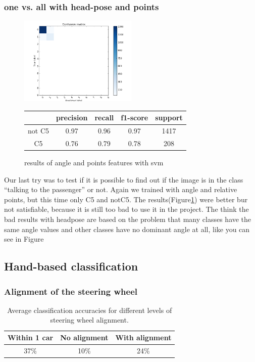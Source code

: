 \documentclass[10pt,twocolumn,letterpaper]{article}
\begin{document}
\subsubsection{one vs. all with head-pose and points}
\begin{figure}[h]
	\centering
	\includegraphics[width=0.5\textwidth]{c5ornot.png}\hspace{0.01\textwidth}
	\begin{tabular}{c||c|c|c|c}
	  & precision&recall&f1-score&support\\	\hline
	  not C5&0.97&0.96&0.97&1417\\
	  C5&0.76&0.79&0.78&208
	\end{tabular}
	\caption{results of angle and points features with svm}
	\label{C5ornot}
	\end{figure}
Our last try was to test if it is possible to find out if the image is in the class ``talking to the passenger'' or not. Again we trained with angle and relative points, but this time only C5 and notC5. The results(Figure\ref{C5ornot}) were better bur not satisfiable, because it is still too bad to use it in the project. The think the bad results with headpose are based on the problem that many classes have the same angle values and other classes have no dominant angle at all, like you can see in Figure

\subsection{Hand-based classification}

	\subsubsection{Alignment of the steering wheel}
	\begin{table}
		\begin{tabular}{c|c|c}
			Within 1 car & No alignment & With alignment \\ 
			\hline 
			37\% & 10\% & 24\% \\ 
		\end{tabular} 
		\caption{Average classification accuracies for different levels of steering wheel alignment.}
		\label{hand_estimation_alignment}
	\end{table}
	
\end{document}
